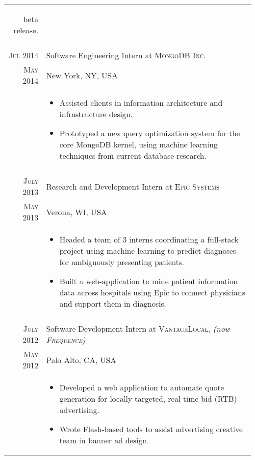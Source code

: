 \documentclass[a4paper,10pt]{article}
\begin{document}
\begin{longtable}{r|p{11cm}}
{\begin{itemize}
{			beta release.
		}
	\end{itemize}
   }\\
 \multicolumn{2}{c}{} \\
 \nopagebreak \textsc{Jul 2014} & Software Engineering Intern at \textsc{MongoDB Inc.}\\
 \nopagebreak \textsc{May 2014} & \small{New York, NY, USA} \\
 \nopagebreak	& \footnotesize{
	\begin{itemize}
		\item[]{
			Assisted clients in information architecture and infrastructure design.
		}
		\item[]{
			Prototyped a new query optimization system for the core MongoDB kernel,
			using machine learning techniques from current database research.
		}
	\end{itemize}
   }\\
 \multicolumn{2}{c}{} \\
 \nopagebreak \textsc{July 2013} & Research and Development Intern at \textsc{Epic Systems}\\
 \nopagebreak \textsc{May 2013} & \small{Verona, WI, USA} \\
 \nopagebreak	& \footnotesize{
	\begin{itemize}
		\item[]{
			Headed a team of 3 interns coordinating a full-stack project using
			machine learning to predict diagnoses for ambiguously presenting patients.
		}
		\item[]{
			Built a web-application to mine patient information data across hospitals
			using Epic to connect physicians and support them in diagnosis.
		}
	\end{itemize}
   }\\
 \multicolumn{2}{c}{} \\
 \nopagebreak \textsc{July 2012} & Software Development Intern at \textsc{VantageLocal}, \small\emph{(now \textsc{Frequence})}\\
 \nopagebreak \textsc{May 2012} & \small{Palo Alto, CA, USA}\\
 \nopagebreak & \footnotesize{
	\begin{itemize}
		\item[]{
			Developed a web application to automate quote generation for
			locally targeted, real time bid (RTB) advertising.
		}
		\item[]{
			Wrote Flash-based tools to assist advertising creative team
			in banner ad design.
		}
	\end{itemize}
}
\end{longtable}
\end{document}
